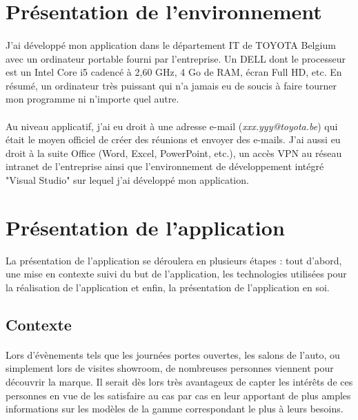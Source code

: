 \documentclass[12pt]{report}
\begin{document}
\section{Présentation de l'environnement}
\paragraph{}
J'ai développé mon application dans le département IT de TOYOTA Belgium avec un ordinateur portable fourni par l'entreprise. Un DELL dont le processeur est un Intel Core i5 cadencé à 2,60 GHz, 4 Go de RAM, écran Full HD, etc. 
En résumé, un ordinateur très puissant qui n'a jamais eu de soucis à faire tourner mon programme ni n'importe quel autre.

\paragraph{}
Au niveau applicatif, j'ai eu droit à une adresse e-mail (\textit{xxx.yyy@toyota.be}) qui était le moyen officiel de créer des réunions et envoyer des e-mails. 
J'ai aussi eu droit à la suite Office (Word, Excel, PowerPoint, etc.), un accès VPN au réseau intranet de l'entreprise ainsi que l'environnement de développement intégré "Visual Studio" sur lequel j'ai développé mon application.

\section{Présentation de l'application}
La présentation de l'application se déroulera en plusieurs étapes : tout d'abord, une mise en contexte suivi du but de l'application, les technologies utilisées pour la réalisation de l'application et enfin, la présentation de l'application en soi.

\subsection{Contexte}
\paragraph{}
Lors d'évènements tels que les journées portes ouvertes, les salons de l'auto, ou simplement lors de visites showroom, de nombreuses personnes viennent pour découvrir la marque. 
Il serait dès lors très avantageux de capter les intérêts de ces personnes en vue de les satisfaire au cas par cas en leur apportant de plus amples informations sur les modèles de la gamme correspondant le plus à leurs besoins.
\end{document}
